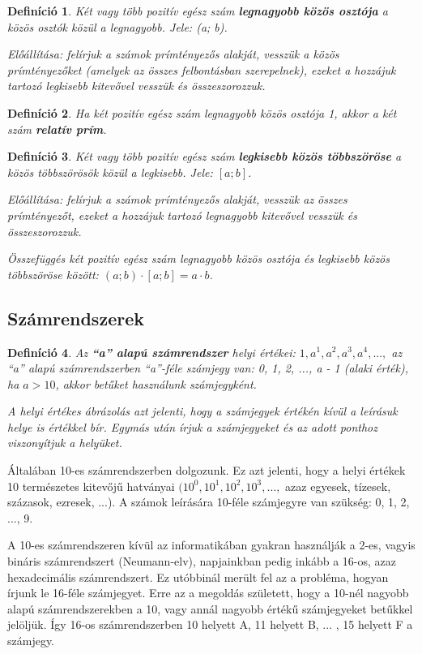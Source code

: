 \documentclass[12pt,a4paper]{article}
\newtheorem{definition}{Definíció} [section]
\begin{document}
\begin{definition}
Két vagy több pozitív egész szám \textbf{legnagyobb közös osztója} a közös osztók közül a legnagyobb. Jele: (a; b).

Előállítása: felírjuk a számok prímtényezős alakját, vesszük a közös prímtényezőket (amelyek az összes felbontásban szerepelnek), ezeket a hozzájuk tartozó legkisebb kitevővel vesszük és összeszorozzuk.
\end{definition}

\begin{definition}
Ha két pozitív egész szám legnagyobb közös osztója 1, akkor a két szám \textbf{relatív prím}.
\end{definition}

\begin{definition}
Két vagy több pozitív egész szám \textbf{legkisebb közös többszöröse} a közös többszörösök közül a legkisebb. Jele: $[a; b]$.

Előállítása: felírjuk a számok prímtényezős alakját, vesszük az összes prímtényezőt, ezeket a hozzájuk tartozó legnagyobb kitevővel vesszük és összeszorozzuk.

Összefüggés két pozitív egész szám legnagyobb közös osztója és legkisebb közös többszöröse között: $(a; b) \cdot [a; b] = a \cdot b$.
\end{definition}

\subsection{Számrendszerek}

\begin{definition}
 Az \textbf{``a'' alapú számrendszer} helyi értékei: $1, a^1, a^2, a^3, a^4, ..., $ az ``a'' alapú számrendszerben ``a''-féle számjegy van: 0, 1, 2, ..., a - 1 (alaki érték), ha $a > 10$, akkor betűket használunk számjegyként.
 
A helyi értékes ábrázolás azt jelenti, hogy a számjegyek értékén kívül a leírásuk helye is értékkel bír. Egymás után írjuk a számjegyeket és az adott ponthoz viszonyítjuk a helyüket.
\end{definition}

Általában 10-es számrendszerben dolgozunk. Ez azt jelenti, hogy a helyi értékek 10 természetes kitevőjű hatványai $(10^0, 10^1, 10^2, 10^3, ...,$ azaz egyesek, tízesek, százasok, ezresek, ...). A számok leírására 10-féle számjegyre van szükség: 0, 1, 2, ..., 9.

A 10-es számrendszeren kívül az informatikában gyakran használják a 2-es, vagyis bináris számrendszert (Neumann-elv), napjainkban pedig inkább a 16-os, azaz hexadecimális számrendszert. Ez utóbbinál merült fel az a probléma, hogyan írjunk le 16-féle számjegyet. Erre az a megoldás született, hogy a 10-nél nagyobb alapú számrendszerekben a 10, vagy annál nagyobb értékű számjegyeket betűkkel jelöljük. Így 16-os számrendszerben 10 helyett A, 11 helyett B, ... , 15 helyett F a számjegy.
\end{document}
